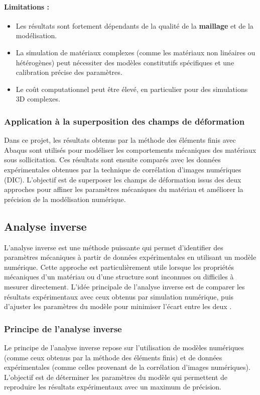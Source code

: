 \documentclass[12pt,a4paper]{article}
\begin{document}
\paragraph{Limitations :}
\begin{itemize}
    \item Les résultats sont fortement dépendants de la qualité de la \textbf{maillage} et de la modélisation.
    \item La simulation de matériaux complexes (comme les matériaux non linéaires ou hétérogènes) peut nécessiter des modèles constitutifs spécifiques et une calibration précise des paramètres.
    \item Le coût computationnel peut être élevé, en particulier pour des simulations 3D complexes.
\end{itemize}

\subsubsection{Application à la superposition des champs de déformation}
Dans ce projet, les résultats obtenus par la méthode des éléments finis avec Abaqus sont utilisés pour modéliser les comportements mécaniques des matériaux sous sollicitation. Ces résultats sont ensuite comparés avec les données expérimentales obtenues par la technique de corrélation d'images numériques (DIC). L'objectif est de superposer les champs de déformation issus des deux approches pour affiner les paramètres mécaniques du matériau et améliorer la précision de la modélisation numérique.



\subsection{Analyse inverse}
L'analyse inverse est une méthode puissante qui permet d'identifier des paramètres mécaniques à partir de données expérimentales en utilisant un modèle numérique. Cette approche est particulièrement utile lorsque les propriétés mécaniques d'un matériau ou d'une structure sont inconnues ou difficiles à mesurer directement. L'idée principale de l'analyse inverse est de comparer les résultats expérimentaux avec ceux obtenus par simulation numérique, puis d'ajuster les paramètres du modèle pour minimiser l'écart entre les deux \cite{Martins2018}.

\subsubsection{Principe de l'analyse inverse}
Le principe de l'analyse inverse repose sur l'utilisation de modèles numériques (comme ceux obtenus par la méthode des éléments finis) et de données expérimentales (comme celles provenant de la corrélation d'images numériques). L'objectif est de déterminer les paramètres du modèle qui permettent de reproduire les résultats expérimentaux avec un maximum de précision.
\end{document}
